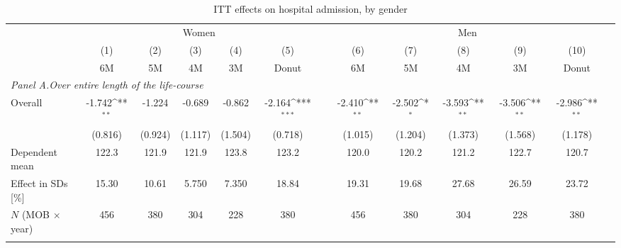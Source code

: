 \begin{landscape}
\vspace*{\fill}
 \begin{table}[H] \centering 
 	\begin{threeparttable} \centering \caption{ITT effects on hospital admission, by gender}\label{tab_mlch: DD_hospital2_female_male} {\def\sym#1{\ifmmode^{#1}\else\(^{#1}\)\fi} 
 			\begin{tabular}{l*{12}{c}}
 				\toprule 
 				& \multicolumn{5}{c}{Women} && \multicolumn{5}{c}{Men} \\ 
 				\cmidrule(lr){2-6} \cmidrule(lr){8-12}
 				&\multicolumn{1}{c}{(1)}&\multicolumn{1}{c}{(2)}&\multicolumn{1}{c}{(3)}&\multicolumn{1}{c}{(4)}&\multicolumn{1}{c}{(5)}&\multicolumn{1}{c}{        }&\multicolumn{1}{c}{(6)}&\multicolumn{1}{c}{(7)}&\multicolumn{1}{c}{(8)}&\multicolumn{1}{c}{(9)}&\multicolumn{1}{c}{(10)}\\
 				&\multicolumn{1}{c}{6M}&\multicolumn{1}{c}{5M}&\multicolumn{1}{c}{4M}&\multicolumn{1}{c}{3M}&\multicolumn{1}{c}{Donut}&&\multicolumn{1}{c}{6M}&\multicolumn{1}{c}{5M}&\multicolumn{1}{c}{4M}&\multicolumn{1}{c}{3M}&\multicolumn{1}{c}{Donut}\\
 				\midrule
 				\multicolumn{5}{l}{\emph{Panel A.Over entire length of the life-course}} \\

 				\hspace*{10pt}Overall		&      -1.742\sym{**} &      -1.224         &      -0.689         &      -0.862         &      -2.164\sym{***} &&      -2.410\sym{**} &      -2.502\sym{*}  &      -3.593\sym{**} &      -3.506\sym{**} &      -2.986\sym{**} \\
				                    		&     (0.816)         &     (0.924)         &     (1.117)         &     (1.504)         &     (0.718)          &&     (1.015)         &     (1.204)         &     (1.373)         &     (1.568)         &     (1.178)         \\
				\midrule Dependent mean		&       122.3         &       121.9         &       121.9         &       123.8         &       123.2          &&       120.0         &       120.2         &       121.2         &       122.7         &       120.7         \\
				Effect in SDs [\%]  		&       15.30         &       10.61         &       5.750         &       7.350         &       18.84          &&       19.31         &       19.68         &       27.68         &       26.59         &       23.72         \\
				\(N\) (MOB $\times$ year)	&         456         &         380         &         304         &         228         &         380          &&         456         &         380         &         304         &         228         &         380         \\
 				\\


\end{tabular}}
\end{threeparttable}
\end{table}
\end{landscape}
